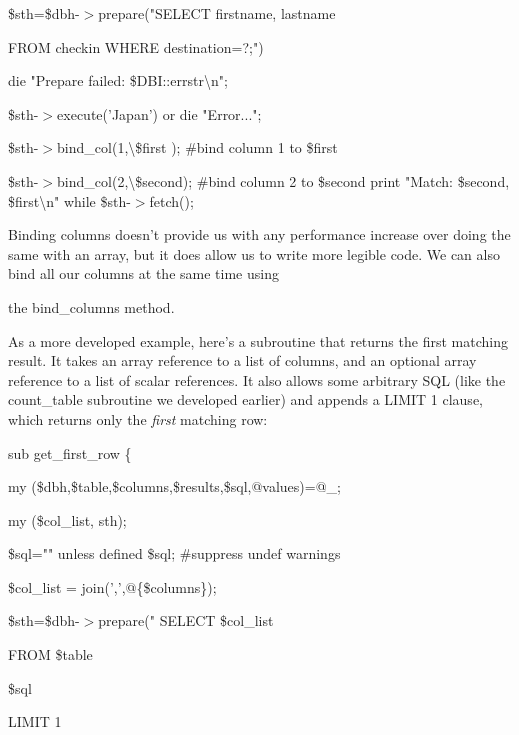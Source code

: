 \documentclass[a4paper,11pt]{book}
\begin{document}
\noindent 

\noindent \$sth=\$dbh-$>$prepare("SELECT firstname, lastname

\noindent FROM checkin WHERE destination=?;")

\noindent \textbar \textbar  die "Prepare failed: \$DBI::errstr\textbackslash n";

\noindent 

\noindent \$sth-$>$execute('Japan') or die "Error...";

\noindent 

\noindent 

\noindent \$sth-$>$bind\_col(1,\textbackslash \$first ); \#bind column 1 to \$first

\noindent \$sth-$>$bind\_col(2,\textbackslash \$second); \#bind column 2 to \$second print "Match: \$second, \$first\textbackslash n" while \$sth-$>$fetch();

\noindent Binding columns doesn't provide us with any performance increase over doing the same with an array, but it does allow us to write more legible code. We can also bind all our columns at the same time using

\noindent the bind\_columns method.

\noindent 

\noindent As a more developed example, here's a subroutine that returns the first matching result. It takes an array reference to a list of columns, and an optional array reference to a list of scalar references. It also allows some arbitrary SQL (like the count\_table subroutine we developed earlier) and appends a LIMIT 1 clause, which returns only the \textit{first }matching row:

\noindent 

\noindent sub get\_first\_row \{

\noindent my (\$dbh,\$table,\$columns,\$results,\$sql,@values)=@\_;

\noindent my (\$col\_list, sth);

\noindent 

\noindent \$sql="" unless defined \$sql; \#suppress undef warnings

\noindent 

\noindent \$col\_list = join(',',@\{\$columns\});

\noindent \$sth=\$dbh-$>$prepare(" SELECT \$col\_list

\noindent FROM \$table

\noindent \$sql

\noindent LIMIT 1
\end{document}
